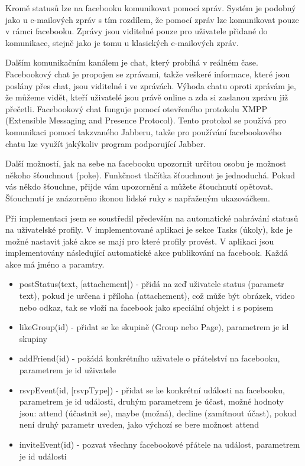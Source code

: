 \documentclass[thesis=M,czech]{FITthesis}[2013/05/10]
\begin{document}
Kromě statusů lze na facebooku komunikovat pomocí zpráv. Systém je podobný jako u e-mailových zpráv s tím rozdílem, že pomocí zpráv lze komunikovat pouze  v rámci facebooku. Zprávy jsou viditelné pouze pro uživatele přidané do komunikace, stejně jako je tomu u klasických e-mailových zpráv. 

Dalším komunikačním kanálem je chat, který probíhá v reálném čase. Facebookový chat je propojen se zprávami, takže veškeré informace, které jsou poslány přes chat, jsou viditelné i ve zprávách. Výhoda chatu oproti zprávám je, že  můžeme vidět, kteří uživatelé jsou právě online a zda si zaslanou zprávu již přečetli. Facebookový chat funguje pomocí otevřeného protokolu XMPP (Extensible Messaging and Presence Protocol). Tento protokol se používá pro komunikaci pomocí takzvaného Jabberu, takže pro používání facebookového chatu lze využít jakýkoliv program podporující Jabber.

Další možností, jak na sebe na facebooku upozornit určitou osobu je možnost někoho šťouchnout (poke). Funkčnost tlačítka šťouchnout je jednoduchá. Pokud vás někdo šťouchne, přijde vám upozornění a můžete šťouchnutí opětovat. Šťouchnutí je znázorněno ikonou lidské ruky s napřaženým ukazováčkem.

Při implementaci jsem se soustředil především na automatické nahrávání statusů na uživatelské profily. V implementované aplikaci je sekce Tasks (úkoly), kde je možné nastavit jaké akce se mají pro které profily provést. V aplikaci jsou implementovány následující automatické akce publikování na facebook. Každá akce má jméno a paramtry.

\begin{itemize}
  \item postStatus(text, [attachement]) - přidá na zeď uživatele status (parametr text), pokud je určena i příloha (attachement), což může být obrázek, video nebo odkaz, tak se vloží na facebook jako speciální objekt i s popisem
  \item likeGroup(id) - přidat se ke skupině (Group nebo Page), parametrem je id skupiny 
  \item addFriend(id) - požádá konkrétního uživatele o přátelství na facebooku, parametrem je id uživatele
  \item rsvpEvent(id, [rsvpType]) - přidat se ke konkrétní události na facebooku, parametrem je id události, druhým parametrem je účast, možné hodnoty jsou: attend (účastnit se), maybe (možná), decline (zamítnout účast), pokud není druhý parametr uveden, jako výchozí se bere možnost attend
  \item inviteEvent(id) - pozvat všechny facebookové přátele na událost, parametrem je id události
\end{itemize}
\end{document}
